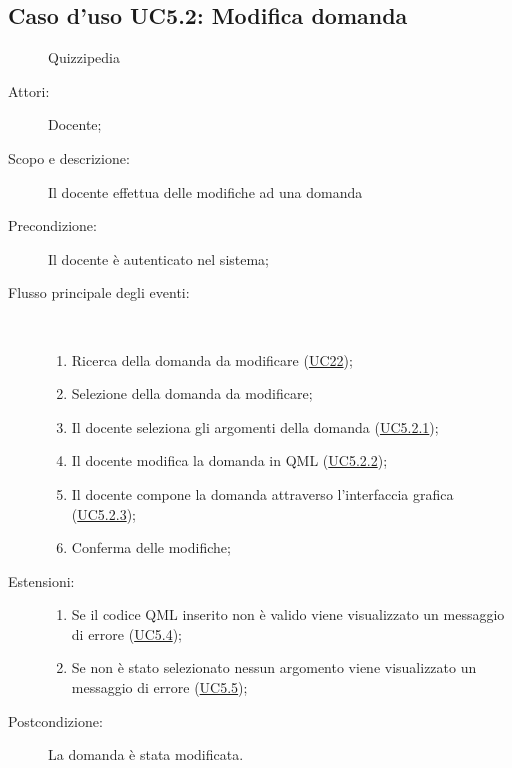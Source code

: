 \subsection{Caso d'uso UC5.2: Modifica domanda}
	\begin{figure}[H]
		\centering
		\begin{resizedtikzpicture}{\textwidth}
		\begin{umlsystem}[x=0, fill=lightgray!20]{Quizzipedia}
		\end{umlsystem}
		\end{resizedtikzpicture}
		\caption{}
	\end{figure}
\begin{description}
\item[Attori:] Docente;
\item[Scopo e descrizione:] Il docente effettua delle modifiche ad una domanda 
      \item[Precondizione:] Il docente è autenticato nel sistema;

        \item[Flusso principale degli eventi:] \ 
 \begin{enumerate}
          \item Ricerca della domanda da modificare (\hyperlink{UC22}{UC22});
          \item Selezione della domanda da modificare;
          \item Il docente seleziona gli argomenti della domanda	 (\hyperlink{UC5.2.1}{UC5.2.1});
          \item Il docente modifica la domanda in QML	 (\hyperlink{UC5.2.2}{UC5.2.2});
          \item Il docente compone la domanda attraverso l'interfaccia grafica (\hyperlink{UC5.2.3}{UC5.2.3});
          \item Conferma delle modifiche;

      \end{enumerate}
    \item[Estensioni:]
      \begin{enumerate}
          \item Se il codice QML inserito non è valido viene visualizzato un messaggio di errore (\hyperlink{UC5.4}{UC5.4});
          \item Se non è stato selezionato nessun argomento viene visualizzato un messaggio di errore (\hyperlink{UC5.5}{UC5.5});

      \end{enumerate}
    \item[Postcondizione:] La domanda è stata modificata.
  \end{description}
\hypertarget{UC5.2.1}{}
